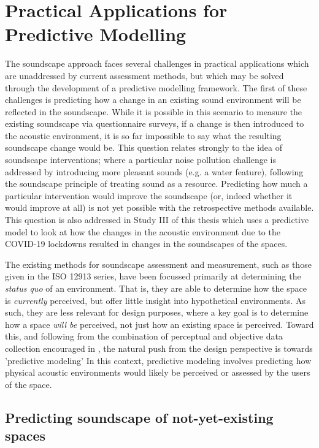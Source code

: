 \section{Practical Applications for Predictive Modelling}

The soundscape approach faces several challenges in practical applications which are unaddressed by current assessment methods, but which may be solved through the development of a predictive modelling framework. The first of these challenges is predicting how a change in an existing sound environment will be reflected in the soundscape. While it is possible in this scenario to measure the existing soundscape via questionnaire surveys, if a change is then introduced to the acoustic environment, it is so far impossible to say what the resulting soundscape change would be. This question relates strongly to the idea of soundscape interventions; where a particular noise pollution challenge is addressed by introducing more pleasant sounds (e.g. a water feature), following the soundscape principle of treating sound as a resource. Predicting how much a particular intervention would improve the soundscape (or, indeed whether it would improve at all) is not yet possible with the retrospective methods available. This question is also addressed in Study III of this thesis  which uses a predictive model to look at how the changes in the acoustic environment due to the COVID-19 lockdowns resulted in changes in the soundscapes of the spaces.

The existing methods for soundscape assessment and measurement, such as those given in the ISO 12913 series, have been focussed primarily at determining the \emph{status quo} of an environment. That is, they are able to determine how the space is \emph{currently} perceived, but offer little insight into hypothetical environments. As such, they are less relevant for design purposes, where a key goal is to determine how a space \emph{will be} perceived, not just how an existing space is perceived. Toward this, and following from the combination of perceptual and objective data collection encouraged in \citet{ISO12913Part2}, the natural push from the design perspective is towards 'predictive modeling' In this context, predictive modeling involves predicting how physical acoustic environments would likely be perceived or assessed by the users of the space.


\subsection{Predicting soundscape of not-yet-existing spaces}

